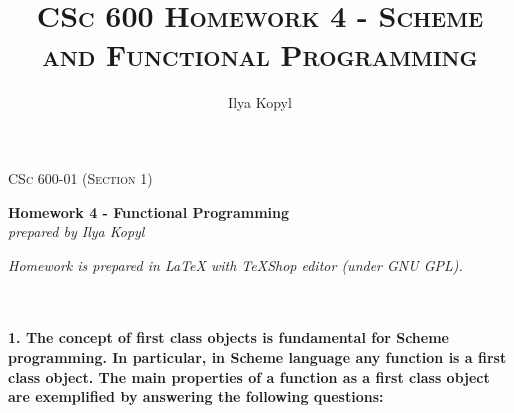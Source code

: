 \documentclass{article}
\author{Ilya Kopyl}
\begin{document}
	\setlength{\grammarparsep}{5pt plus 1pt minus 1pt} %
	\setlength{\grammarindent}{13em} %




	\begin{titlepage}
		\begin{center}
				\Large\textsc{CSc 600-01 (Section 1)}
				
				\Large\textbf{Homework 4 - Functional Programming}\\

				\Large\textit{prepared by Ilya Kopyl}
				
		\end{center}	
	\end{titlepage}


	\title{\textsc{CSc 600 Homework 4 - Scheme and Functional Programming}}	
	\maketitle
	
		\noindent \textit{Homework is prepared in LaTeX with TeXShop editor (under GNU GPL).}
		


	\rmfamily\




	\paragraph{1. The concept of first class objects is fundamental for Scheme programming. In particular, in Scheme language any function is a first class object. The main properties of a function as a first class object are exemplified by answering the following questions:}\
	\rmfamily\\\
		
\end{document}
